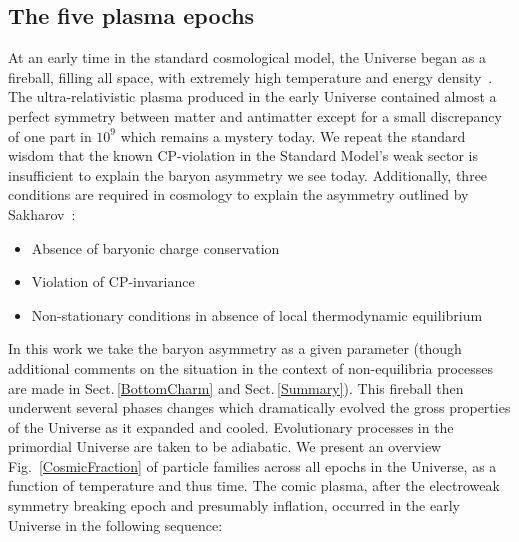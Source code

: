 \documentclass[universe,article,submit,moreauthors,pdftex,a4paper]{Definitions/mdpi}
\newcommand*{\rf}[1]{Fig.~{\ref{#1}}}
\newcommand*{\rsec}[1]{Sect.\,{\ref{#1}}}
\begin{document}
\subsection{The five plasma epochs}\label{sec:Timeline}
\noindent At an early time in the standard cosmological model, the Universe began as a fireball, filling all space, with extremely high temperature and energy density~\cite{Rafelski:2015cxa}. The ultra-relativistic plasma produced in the early Universe contained almost a perfect symmetry between matter and antimatter except for a small discrepancy of one part in $10^{9}$ which remains a mystery today. We repeat the standard wisdom that the known CP-violation in the Standard Model's weak sector is insufficient to explain the baryon asymmetry we see today. Additionally, three conditions are required in cosmology to explain the asymmetry outlined by Sakharov~\cite{Sakharov:1967dj,Sakharov:1988vdp}:
\begin{itemize}
 \item Absence of baryonic charge conservation 
 \item Violation of CP-invariance
 \item Non-stationary conditions in absence of local thermodynamic equilibrium
\end{itemize}
In this work we take the baryon asymmetry as a given parameter (though additional comments on the situation in the context of non-equilibria processes are made in \rsec{BottomCharm} and \rsec{Summary}). This fireball then underwent several phases changes which dramatically evolved the gross properties of the Universe as it expanded and cooled. Evolutionary processes in the primordial Universe are taken to be adiabatic. We present an overview \rf{CosmicFraction} of particle families across all epochs in the Universe, as a function of temperature and thus time. The comic plasma, after the electroweak symmetry breaking epoch and presumably inflation, occurred in the early Universe in the following sequence:
\end{document}
